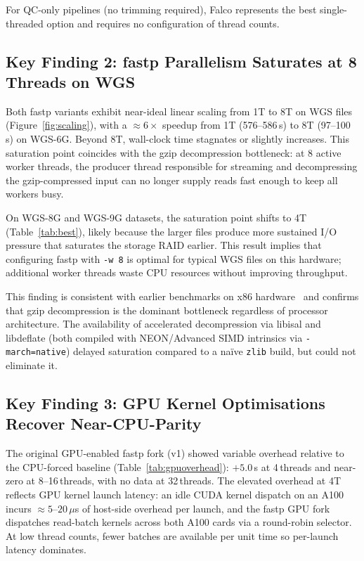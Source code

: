 \documentclass[a4paper,12pt]{article}
\begin{document}
For QC-only pipelines (no trimming required), Falco represents the best single-
threaded option and requires no configuration of thread counts.

\subsection{Key Finding 2: fastp Parallelism Saturates at 8 Threads on WGS} 

Both fastp variants exhibit near-ideal linear scaling from 1T to 8T on WGS
files (Figure~\ref{fig:scaling}), with a ${\approx}6\times$ speedup from 1T
(576--586\,s) to 8T (97--100\,s) on WGS-6G.  Beyond 8T, wall-clock time
stagnates or slightly increases.  This saturation point coincides with the
gzip decompression bottleneck: at 8 active worker threads, the producer thread
responsible for streaming and decompressing the gzip-compressed input can no
longer supply reads fast enough to keep all workers busy.

On WGS-8G and WGS-9G datasets, the saturation point shifts to 4T (Table~\ref{tab:best}),
likely because the larger files produce more sustained I/O pressure that saturates
the storage RAID earlier.  This result implies that configuring fastp with
\texttt{-w~8} is optimal for typical WGS files on this hardware; additional
worker threads waste CPU resources without improving throughput.

This finding is consistent with earlier benchmarks on x86 hardware~\cite{Chen2018fastp}
and confirms that gzip decompression is the dominant bottleneck regardless of
processor architecture.  The availability of accelerated decompression via
libisal and libdeflate (both compiled with NEON/Advanced SIMD intrinsics via
\texttt{-march=native}) delayed saturation compared to a na\"ive \texttt{zlib}
build, but could not eliminate it.

\subsection{Key Finding 3: GPU Kernel Optimisations Recover Near-CPU-Parity}

The original GPU-enabled fastp fork (v1) showed variable overhead relative to
the CPU-forced baseline (Table~\ref{tab:gpuoverhead}): $+5.0$\,s at 4\,threads
and near-zero at 8--16\,threads, with no data at 32\,threads.  The elevated
overhead at 4T reflects GPU kernel launch latency: an idle CUDA kernel dispatch
on an A100 incurs ${\approx}5$--$20\,\mu$s of host-side overhead per launch,
and the fastp GPU fork dispatches read-batch kernels across both A100 cards via
a round-robin selector.  At low thread counts, fewer batches are available per
unit time so per-launch latency dominates.
\end{document}
